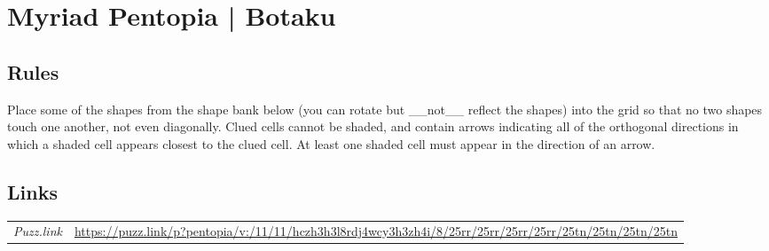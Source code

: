 \section[Myriad Pentopia | Botaku {[\emph{Pentopia (Custom Shape Bank, No Reflection)}]}]{Myriad Pentopia | {\normalfont Botaku}}
\label{sec:42-myriad-pentopia-botaku}

\subsection*{Rules}
\begin{markdown}
Place some of the shapes from the shape bank below (you can rotate but __not__ reflect the shapes) into the grid so that no two shapes touch one another, not even diagonally. Clued cells cannot be shaded, and contain arrows indicating all of the orthogonal directions in which a shaded cell appears closest to the clued cell. At least one shaded cell must appear in the direction of an arrow.
\end{markdown}
\subsection*{Links}
\begin{tabularx}{\textwidth}{l X}
\emph{Puzz.link} & \url{https://puzz.link/p?pentopia/v:/11/11/hczh3h3l8rdj4wcy3h3zh4i/8/25rr/25rr/25rr/25rr/25tn/25tn/25tn/25tn} \\
\end{tabularx}
\pagebreak

